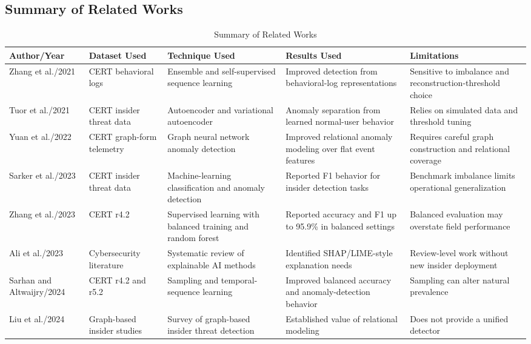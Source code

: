 \documentclass[journal]{IEEEtran}
\begin{document}
\subsection{Summary of Related Works}
\begin{table}[!tbp]
\caption{Summary of Related Works}
\label{tab:related_works}
\centering
\setlength{\tabcolsep}{3pt}
\renewcommand{\arraystretch}{1.15}
\begin{tabular}{p{}p{}p{}p{}p{}}
\toprule
Author/Year & Dataset Used & Technique Used & Results Used & Limitations \\
\midrule
Zhang et al./2021 \cite{zhang2021ensemble} & CERT behavioral logs & Ensemble and self-supervised sequence learning & Improved detection from behavioral-log representations & Sensitive to imbalance and reconstruction-threshold choice \\
Tuor et al./2021 \cite{tuor2021autoencoder} & CERT insider threat data & Autoencoder and variational autoencoder & Anomaly separation from learned normal-user behavior & Relies on simulated data and threshold tuning \\
Yuan et al./2022 \cite{yuan2022gnn} & CERT graph-form telemetry & Graph neural network anomaly detection & Improved relational anomaly modeling over flat event features & Requires careful graph construction and relational coverage \\
Sarker et al./2023 \cite{sarker2023insider} & CERT insider threat data & Machine-learning classification and anomaly detection & Reported F1 behavior for insider detection tasks & Benchmark imbalance limits operational generalization \\
Zhang et al./2023 \cite{zhang2023supervised} & CERT r4.2 & Supervised learning with balanced training and random forest & Reported accuracy and F1 up to 95.9\% in balanced settings & Balanced evaluation may overstate field performance \\
Ali et al./2023 \cite{ali2023xai} & Cybersecurity literature & Systematic review of explainable AI methods & Identified SHAP/LIME-style explanation needs & Review-level work without new insider deployment \\
Sarhan and Altwaijry/2024 \cite{balanced2024imbalance} & CERT r4.2 and r5.2 & Sampling and temporal-sequence learning & Improved balanced accuracy and anomaly-detection behavior & Sampling can alter natural prevalence \\
Liu et al./2024 \cite{liu2024graph} & Graph-based insider studies & Survey of graph-based insider threat detection & Established value of relational modeling & Does not provide a unified detector \\

\end{tabular}
\end{table}
\end{document}
